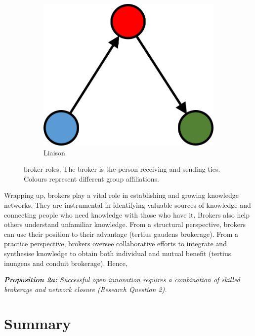 \begin{figure}
  \hspace{2em}
  \begin{subfigure}[b]{0.25\textwidth}
    \includegraphics[width=\textwidth]{Images/b_O.png}
    \caption{Liaison}
    \label{fig:5}
  \end{subfigure}
  \caption[Broker roles]{\citet{gould1989structures} broker roles. The broker is the person receiving and sending ties. Colours represent different group affiliations.}%
    \label{fig:gf_roles}%
\end{figure}

Wrapping up, brokers play a vital role in establishing and growing knowledge networks. They are instrumental in identifying valuable sources of knowledge and connecting people who need knowledge with those who have it. Brokers also help others understand unfamiliar knowledge. From a structural perspective, brokers can use their position to their advantage (tertius gaudens brokerage). From a practice perspective, brokers oversee collaborative efforts to integrate and synthesise knowledge to obtain both individual and mutual benefit (tertius inungens and conduit brokerage). Hence, \bigskip  

\begin{tcolorbox}
\textit{\textbf{Proposition 2a:} Successful open innovation requires a combination of skilled brokerage and network closure (Research Question 2).}
\end{tcolorbox}

\section{Summary}

